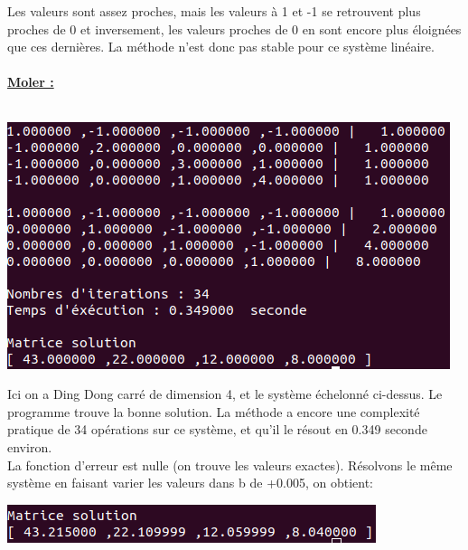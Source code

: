 \documentclass[a4paper]{article}
\begin{document}
Les valeurs sont assez proches, mais les valeurs à 1 et -1 se retrouvent plus proches de 0 et inversement, les valeurs proches de 0 en sont encore plus éloignées que ces dernières.
La méthode n'est donc pas stable pour ce système linéaire.
\\
\\
\textbf{\underline{\large{Moler :}}}
\\
\\
\begin{center}
	\includegraphics[scale=0.5]{./img/gauss/TestMoler.png} \\
\end{center}

Ici on a Ding Dong carré de dimension 4, et le système échelonné ci-dessus.
Le programme trouve la bonne solution.
La méthode a encore une complexité pratique de 34 opérations sur ce système, et qu'il le résout en 0.349 seconde environ.
\\
La fonction d'erreur est nulle (on trouve les valeurs exactes).
Résolvons le même système en faisant varier les valeurs dans b de +0.005, on obtient:
\\
\begin{center}
	\includegraphics[scale=0.5]{./img/gauss/moler005.png} \\
\end{center}
\end{document}
